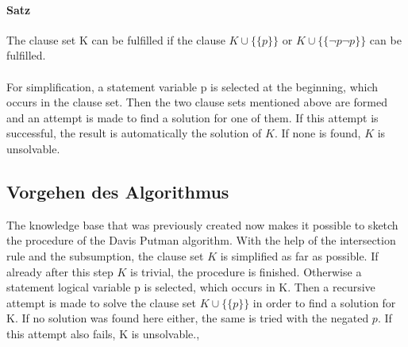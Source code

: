 \paragraph{Satz} %
The clause set K can be fulfilled if the clause $K \cup \bigl\{\{p\}\bigr\}$ or $K \cup \bigl\{\{\neg p\neg p\}\bigr\}$ can be fulfilled.
\\
\\
For simplification, a statement variable p is selected at the beginning, which occurs in the clause set. Then the two clause sets mentioned above are formed and an attempt is made to find a solution for one of them. If this attempt is successful, the result is automatically the solution of $K$. If none is found, $K$ is unsolvable.
\subsection{Vorgehen des Algorithmus}
The knowledge base that was previously created now makes it possible to sketch the procedure of the Davis Putman algorithm. With the help of the intersection rule and the subsumption, the clause set $K$ is simplified as far as possible. If already after this step $K$ is trivial, the procedure is finished. Otherwise a statement logical variable p is selected, which occurs in K. Then a recursive attempt is made to solve the clause set $K \cup \bigl\{\{p\}\bigr\}$ in order to find a solution for K. If no solution was found here either, the same is tried with the negated $p$. If this attempt also fails, K is unsolvable.\cite{Zhang2000}, \cite{Stroetman2019}

